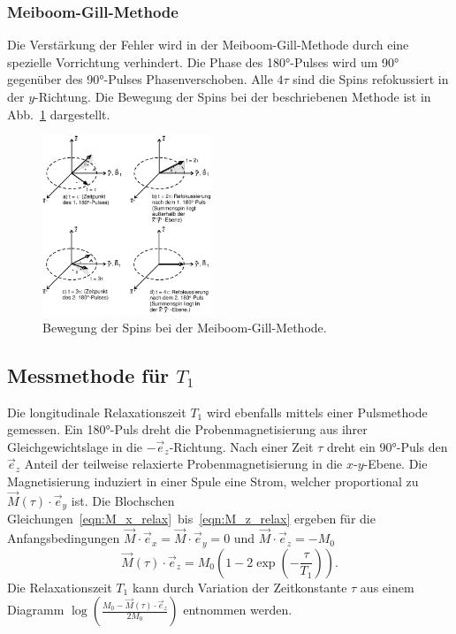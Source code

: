 \subsubsection{Meiboom-Gill-Methode}
\vspace{-15pt}
Die Verstärkung der Fehler wird in der Meiboom-Gill-Methode durch eine spezielle
Vorrichtung verhindert. Die Phase des 180°-Pulses wird um 90° gegenüber des
90°-Pulses Phasenverschoben. Alle $4\tau$ sind die Spins refokussiert in der
$y$-Richtung. Die Bewegung der Spins bei der beschriebenen Methode ist in
Abb.~\ref{fig:meiboom_gill} dargestellt.
\begin{figure}[h!]
  \centering
  \includegraphics[width = 0.45\textwidth]{Pics/meiboom.pdf}
  \caption{Bewegung der Spins bei der Meiboom-Gill-Methode\cite{anleitung}.}
  \label{fig:meiboom_gill}
\end{figure}
\FloatBarrier
\subsection{Messmethode für $T_1$}
Die longitudinale Relaxationszeit $T_1$ wird ebenfalls mittels einer Pulsmethode
gemessen. Ein 180°-Puls dreht die Probenmagnetisierung aus ihrer Gleichgewichtslage
in die $-\vec{e}_z$-Richtung. Nach einer Zeit $\tau$ dreht ein 90°-Puls
den $\vec{e}_z$ Anteil der teilweise relaxierte Probenmagnetisierung
in die $x$-$y$-Ebene. Die Magnetisierung induziert in einer Spule eine Strom,
welcher proportional zu $\vec{M}(\tau)\cdot\vec{e}_y$ ist.
Die Blochschen Gleichungen~\eqref{eqn:M_x_relax}~bis~\eqref{eqn:M_z_relax}
ergeben für die Anfangsbedingungen $\vec{M}\cdot\vec{e}_x = \vec{M}\cdot\vec{e}_y = 0$
und $\vec{M}\cdot\vec{e}_z = -M_0$
\begin{equation}
  \label{eqn:zeit_mag}
  \vec{M}(\tau)\cdot\vec{e}_z = M_0\left(1-2\exp{\left(-\frac{\tau}{T_1}\right)}\right).
\end{equation}
Die Relaxationszeit $T_1$ kann durch Variation der Zeitkonstante $\tau$
aus einem Diagramm $\log{\left(\frac{M_0 - \vec{M}(\tau)\cdot\vec{e}_z}{2M_0}\right)}$
entnommen werden.

